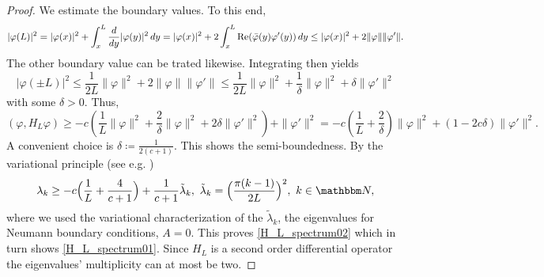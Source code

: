 \begin{proof}
We estimate the boundary values. To this end,
\begin{equation*}
  |\varphi(L)|^2 = |\varphi(x)|^2 + \int_x^L \frac{d}{dy} |\varphi(y)|^2\, dy
                 = |\varphi(x)|^2 + 2\int_x^L \operatorname{Re}(\bar\varphi(y)\varphi'(y))\, dy
                 \leq |\varphi(x)|^2 + 2\|\varphi\| \|\varphi'\| .
\end{equation*}
The other boundary value can be trated likewise. Integrating then yields
\begin{equation*}
  |\varphi(\pm L)|^2 \leq \frac{1}{2L}\|\varphi\|^2 + 2\|\varphi\|\|\varphi'\| 
                     \leq \frac{1}{2L}\|\varphi\|^2 + \frac{1}{\delta}\|\varphi\|^2 + \delta\|\varphi'\|^2
\end{equation*}
with some $\delta>0$. Thus,
\begin{equation*}
  (\varphi,H_L\varphi) 
    \geq -c ( \frac{1}{L}\|\varphi\|^2 + \frac{2}{\delta}\|\varphi\|^2 + 2\delta\|\varphi'\|^2) + \|\varphi'\|^2
     = -c(\frac{1}{L} + \frac{2}{\delta})\|\varphi\|^2 + (1-2c\delta)\|\varphi'\|^2 .
\end{equation*}
A convenient choice is $\delta\coloneqq\frac{1}{2(c+1)}$.
This shows the semi-boundedness. By the variational principle (see e.g. \cite[Thm. XIII.1]{ReedSimon1978})
\begin{equation*}
  \lambda_k \geq -c\Big(\frac{1}{L} + \frac{4}{c+1}\Big) + \frac{1}{c+1}\tilde\lambda_k,\ 
  \tilde\lambda_k=\Big(\frac{\pi(k-1)}{2L}\Big)^2,\ k\in\N,
\end{equation*}
where we used the variational characterization of the $\tilde\lambda_k$, the eigenvalues for Neumann boundary conditions, $A=0$. 
This proves \eqref{H_L_spectrum02} which in turn shows \eqref{H_L_spectrum01}. 
Since $H_L$ is a second order differential operator the eigenvalues' multiplicity can at most be two.
\end{proof}


